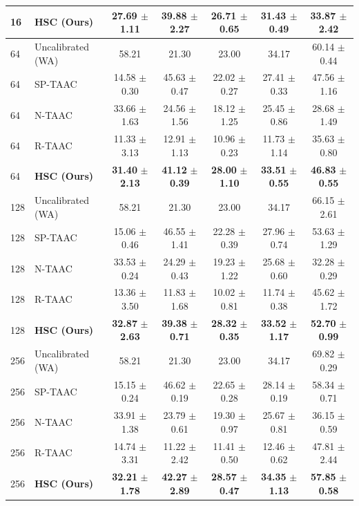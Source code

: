 \documentclass{article}
\begin{document}
\begin{table}[t]
\begin{center}
\begin{small}
\begin{tabular}{llccccc}
16 & \textbf{HSC (Ours)} & \textbf{27.69} $\pm$ \textbf{1.11} & \textbf{39.88} $\pm$ \textbf{2.27} & \textbf{26.71} $\pm$ \textbf{0.65} & \textbf{31.43} $\pm$ \textbf{0.49} & \textbf{33.87} $\pm$ \textbf{2.42} \\
\midrule
64 & Uncalibrated (WA) & 58.21 & 21.30 & 23.00 & 34.17 & 60.14 $\pm$ 0.44 \\
64 & SP-TAAC & 14.58 $\pm$ 0.30 & 45.63 $\pm$ 0.47 & 22.02 $\pm$ 0.27 & 27.41 $\pm$ 0.33 & 47.56 $\pm$ 1.16 \\
64 & N-TAAC & 33.66 $\pm$ 1.63 & 24.56 $\pm$ 1.56 & 18.12 $\pm$ 1.25 & 25.45 $\pm$ 0.86 & 28.68 $\pm$ 1.49 \\
64 & R-TAAC & 11.33 $\pm$ 3.13 & 12.91 $\pm$ 1.13 & 10.96 $\pm$ 0.23 & 11.73 $\pm$ 1.14 & 35.63 $\pm$ 0.80 \\
64 & \textbf{HSC (Ours)} & \textbf{31.40} $\pm$ \textbf{2.13} & \textbf{41.12} $\pm$ \textbf{0.39} & \textbf{28.00} $\pm$ \textbf{1.10} & \textbf{33.51} $\pm$ \textbf{0.55} & \textbf{46.83} $\pm$ \textbf{0.55} \\
\midrule
128 & Uncalibrated (WA) & 58.21 & 21.30 & 23.00 & 34.17 & 66.15 $\pm$ 2.61 \\
128 & SP-TAAC & 15.06 $\pm$ 0.46 & 46.55 $\pm$ 1.41 & 22.28 $\pm$ 0.39 & 27.96 $\pm$ 0.74 & 53.63 $\pm$ 1.29 \\
128 & N-TAAC & 33.53 $\pm$ 0.24 & 24.29 $\pm$ 0.43 & 19.23 $\pm$ 1.22 & 25.68 $\pm$ 0.60 & 32.28 $\pm$ 0.29 \\
128 & R-TAAC & 13.36 $\pm$ 3.50 & 11.83 $\pm$ 1.68 & 10.02 $\pm$ 0.81 & 11.74 $\pm$ 0.38 & 45.62 $\pm$ 1.72 \\
128 & \textbf{HSC (Ours)} & \textbf{32.87} $\pm$ \textbf{2.63} & \textbf{39.38} $\pm$ \textbf{0.71} & \textbf{28.32} $\pm$ \textbf{0.35} & \textbf{33.52} $\pm$ \textbf{1.17} & \textbf{52.70} $\pm$ \textbf{0.99} \\
\midrule
256 & Uncalibrated (WA) & 58.21 & 21.30 & 23.00 & 34.17 & 69.82 $\pm$ 0.29 \\
256 & SP-TAAC & 15.15 $\pm$ 0.24 & 46.62 $\pm$ 0.19 & 22.65 $\pm$ 0.28 & 28.14 $\pm$ 0.19 & 58.34 $\pm$ 0.71 \\
256 & N-TAAC & 33.91 $\pm$ 1.38 & 23.79 $\pm$ 0.61 & 19.30 $\pm$ 0.97 & 25.67 $\pm$ 0.81 & 36.15 $\pm$ 0.59 \\
256 & R-TAAC & 14.74 $\pm$ 3.31 & 11.22 $\pm$ 2.42 & 11.41 $\pm$ 0.50 & 12.46 $\pm$ 0.62 & 47.81 $\pm$ 2.44 \\
256 & \textbf{HSC (Ours)} & \textbf{32.21} $\pm$ \textbf{1.78} & \textbf{42.27} $\pm$ \textbf{2.89} & \textbf{28.57} $\pm$ \textbf{0.47} & \textbf{34.35} $\pm$ \textbf{1.13} & \textbf{57.85} $\pm$ \textbf{0.58} \\
\bottomrule
\end{tabular}
\end{small}
\end{center}
\vskip -0.15in
\vspace{-3mm}
\end{table}
\end{document}

